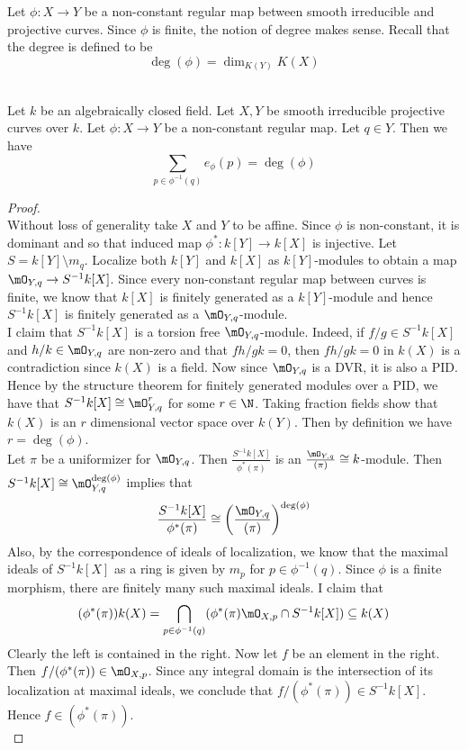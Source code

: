 \documentclass[a4paper]{article}
\begin{document}
Let $\phi:X\to Y$ be a non-constant regular map between smooth irreducible and projective curves. Since $\phi$ is finite, the notion of degree makes sense. Recall that the degree is defined to be $$\deg(\phi)=\dim_{K(Y)}K(X)$$

\begin{prp}{}{}\\
Let $k$ be an algebraically closed field. Let $X,Y$ be smooth irreducible projective curves over $k$. Let $\phi:X\to Y$ be a non-constant regular map. Let $q\in Y$. Then we have $$\sum_{p\in\phi^{-1}(q)}e_\phi(p)=\deg(\phi)$$
\begin{proof}\\
Without loss of generality take $X$ and $Y$ to be affine. Since $\phi$ is non-constant, it is dominant and so that induced map $\phi^\ast:k[Y]\to k[X]$ is injective. Let $S=k[Y]\setminus m_q$. Localize both $k[Y]$ and $k[X]$ as $k[Y]$-modules to obtain a map $\mO_{Y,q}\to S^{-1}k[X]$. Since every non-constant regular map between curves is finite, we know that $k[X]$ is finitely generated as a $k[Y]$-module and hence $S^{-1}k[X]$ is finitely generated as a $\mO_{Y,q}$-module. \\

I claim that $S^{-1}k[X]$ is a torsion free $\mO_{Y,q}$-module. Indeed, if $f/g\in S^{-1}k[X]$ and $h/k\in\mO_{Y,q}$ are non-zero and that $fh/gk=0$, then $fh/gk=0$ in $k(X)$ is a contradiction since $k(X)$ is a field. Now since $\mO_{Y,q}$ is a DVR, it is also a PID. Hence by the structure theorem for finitely generated modules over a PID, we have that $S^{-1}k[X]\cong\mO_{Y,q}^r$ for some $r\in\N$. Taking fraction fields show that $k(X)$ is an $r$ dimensional vector space over $k(Y)$. Then by definition we have $r=\deg(\phi)$. \\

Let $\pi$ be a uniformizer for $\mO_{Y,q}$. Then $\frac{S^{-1}k[X]}{\phi^\ast(\pi)}$ is an $\frac{\mO_{Y,q}}{(\pi)}\cong k$-module. Then $S^{-1}k[X]\cong\mO_{Y,q}^{\deg(\phi)}$ implies that $$\frac{S^{-1}k[X]}{\phi^\ast(\pi)}\cong\left(\frac{\mO_{Y,q}}{(\pi)}\right)^{\deg(\phi)}$$ Also, by the correspondence of ideals of localization, we know that the maximal ideals of $S^{-1}k[X]$ as a ring is given by $m_p$ for $p\in\phi^{-1}(q)$. Since $\phi$ is a finite morphism, there are finitely many such maximal ideals. I claim that $$(\phi^\ast(\pi))k(X)=\bigcap_{p\in\phi^{-1}(q)}(\phi^\ast(\pi)\mO_{X,p}\cap S^{-1}k[X])\subseteq k(X)$$ Clearly the left is contained in the right. Now let $f$ be an element in the right. Then $f/(\phi^\ast(\pi))\in\mO_{X,p}$. Since any integral domain is the intersection of its localization at maximal ideals, we conclude that $f/(\phi^\ast(\pi))\in S^{-1}k[X]$. Hence $f\in(\phi^\ast(\pi))$. \\


\end{proof}
\end{prp}
\end{document}
